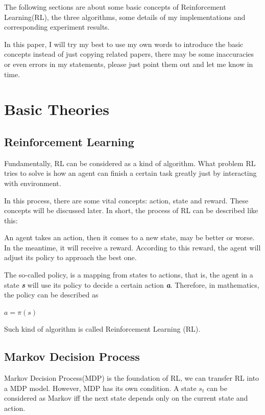 \documentclass[10pt,twocolumn,letterpaper]{article}
\begin{document}
The following sections are about some basic concepts of Reinforcement Learning(RL), the three algorithms, some details of my implementations and corresponding experiment results.

In this paper, I will try my best to use my own words to introduce the basic concepts instead of just copying related papers, there may be some inaccuracies or even errors in my statements, please just point them out and let me know in time.

\section{Basic Theories}
	\subsection{Reinforcement Learning}
	Fundamentally, RL can be considered as a kind of algorithm. What problem RL tries to solve is how an agent can finish a certain task greatly just by interacting with environment. 
	
	In this process, there are some vital concepts: action, state and reward. These concepts will be discussed later. In short, the process of RL can be described like this: 
	
	An agent takes an action, then it comes to a new state, may be better or worse. In the meantime, it will receive a reward. According to this reward, the agent will adjust its policy to approach the best one. 
	
	The so-called policy, is a mapping from states to actions, that is, the agent in a state \textbf{\textit{s}} will use its policy to decide a certain action \textbf{\textit{a}}. Therefore, in mathematics, the policy can be described as
	
	\begin{center}
		$a=\pi(s)$
	\end{center}
	
	Such kind of algorithm is called Reinforcement Learning (RL).
	
	\subsection{Markov Decision Process}
	Markov Decision Process(MDP) is the foundation of RL, we can transfer RL into a MDP model. However, MDP has its own condition. A state \textit{\textbf{$s_{t}$}} can be considered as Markov iff the next state depends only on the current state and action.
	
\end{document}
